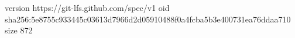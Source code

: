 version https://git-lfs.github.com/spec/v1
oid sha256:5e8755c933445c03613d7966d2d05910488f0a4fcba5b3e400731ea76ddaa710
size 872
